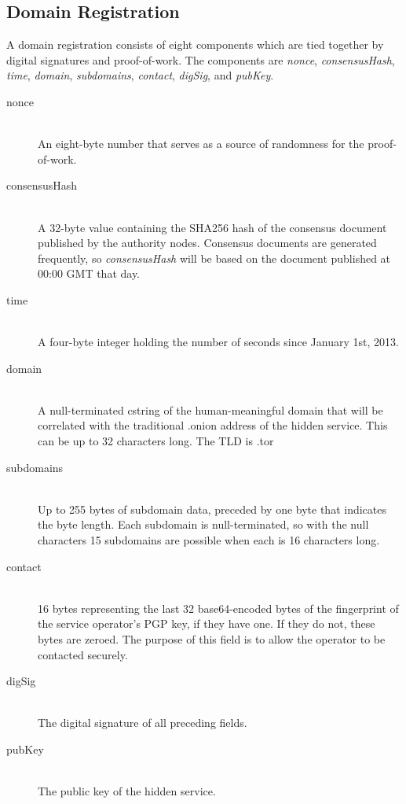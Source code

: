 
\subsection{Domain Registration}

A domain registration consists of eight components which are tied together by digital signatures and proof-of-work. The components are \textit{nonce}, \textit{consensusHash}, \textit{time}, \textit{domain}, \textit{subdomains}, \textit{contact}, \textit{digSig}, and \textit{pubKey}.

\begin{description}
	\item[nonce] \hfill \\
		An eight-byte number that serves as a source of randomness for the proof-of-work.
	\item[consensusHash] \hfill \\
		A 32-byte value containing the SHA256 hash of the consensus document published by the authority nodes. Consensus documents are generated frequently, so \textit{consensusHash} will be based on the document published at 00:00 GMT that day.
	\item[time] \hfill \\
		A four-byte integer holding the number of seconds since January 1st, 2013.
	\item[domain] \hfill \\
		A null-terminated cstring of the human-meaningful domain that will be correlated with the traditional .onion address of the hidden service. This can be up to 32 characters long. The TLD is .tor
	\item[subdomains] \hfill \\
		Up to 255 bytes of subdomain data, preceded by one byte that indicates the byte length. Each subdomain is null-terminated, so with the null characters 15 subdomains are possible when each is 16 characters long.
	\item[contact] \hfill \\
		16 bytes representing the last 32 base64-encoded bytes of the fingerprint of the service operator's PGP key, if they have one. If they do not, these bytes are zeroed. The purpose of this field is to allow the operator to be contacted securely.
	\item[digSig] \hfill \\
		The digital signature of all preceding fields.
	\item[pubKey] \hfill \\
		The public key of the hidden service.
\end{description}

